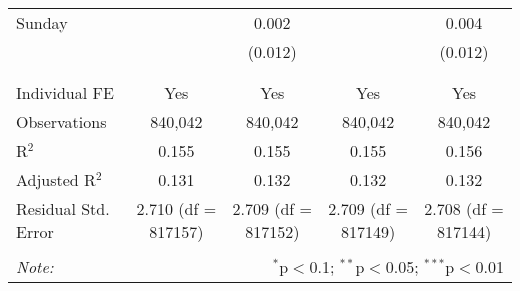 \documentclass[
]{article}
\begin{document}
\begin{table}[!htbp]
{\begin{tabular}{@{\extracolsep{5pt}}lcccc}
 Sunday &  & 0.002 &  & 0.004 \\ 
  &  & (0.012) &  & (0.012) \\ 
  & & & & \\ 
\hline \\[-1.8ex] 
Individual FE & Yes & Yes & Yes & Yes \\ 
Observations & 840,042 & 840,042 & 840,042 & 840,042 \\ 
R$^{2}$ & 0.155 & 0.155 & 0.155 & 0.156 \\ 
Adjusted R$^{2}$ & 0.131 & 0.132 & 0.132 & 0.132 \\ 
Residual Std. Error & 2.710 (df = 817157) & 2.709 (df = 817152) & 2.709 (df = 817149) & 2.708 (df = 817144) \\ 
\hline 
\hline \\[-1.8ex] 
\textit{Note:}  & \multicolumn{4}{r}{$^{*}$p$<$0.1; $^{**}$p$<$0.05; $^{***}$p$<$0.01} \\ 
\end{tabular}
} 
\end{table}
\end{document}
